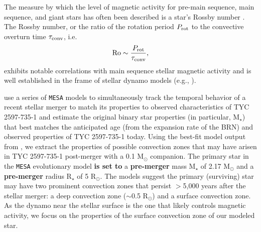 \documentclass[linenumbers]{aastex631}
\begin{document}
%
The measure by which the level of magnetic activity for pre-main sequence, main sequence, and giant stars has often been described is a star's Rossby number \citep{Preibisch+2005, Pizzolato+2003, Gondoin+2005}.
The Rossby number, or the ratio of the rotation period $P_{\rm rot}$ to the convective overturn time $\tau_{\rm conv}$, i.e.
\begin{equation}
{\rm Ro} \sim \frac{P_{\rm rot}}{\tau_{\rm conv}},
\end{equation}
exhibits notable correlations with main sequence stellar magnetic activity and is well established in the frame of stellar dynamo models (e.g., \citealt{Brandenburg+1998}).

\citet{2020Natur.587..387H} use a series of \texttt{MESA} models to simultaneously track the temporal behavior of a recent stellar merger to match its properties to observed characteristics of TYC 2597-735-1 and estimate the original binary star properties (in particular, M$_{\star}$) that best matches the anticipated age (from the expansion rate of the BRN) and observed properties of TYC 2597-735-1 today. Using the best-fit model output from \citet{2020Natur.587..387H}, we extract the properties of possible convection zones that may have arisen in TYC 2597-735-1 post-merger with a 0.1 M$_{\odot}$ companion. The primary star in the \texttt{MESA} evolutionary model \textbf{is set to} a \textbf{pre-merger} mass M$_{\star}$ of 2.17 M$_{\odot}$ and a \textbf{pre-merger} radius R$_{\star}$ of 5 R$_{\odot}$. The models suggest the primary (surviving) star may have two prominent convection zones that persist $>$5,000 years after the stellar merger: a deep convection zone ($\sim$0.5 R$_{\odot}$) and a surface convection zone. As the dynamo near the stellar surface is the one that likely controls magnetic activity, we focus on the properties of the surface convection zone of our modeled star.
\end{document}
